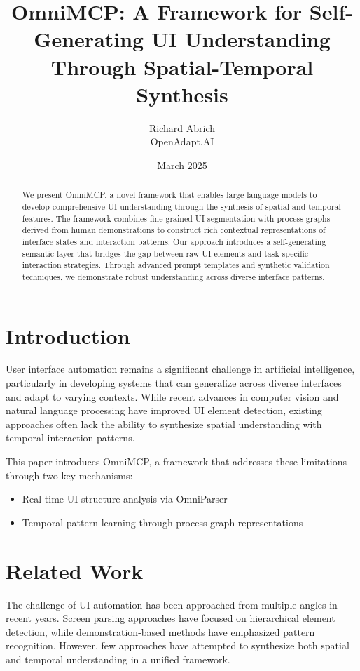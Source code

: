 \documentclass{article}
\title{OmniMCP: A Framework for Self-Generating UI Understanding Through Spatial-Temporal Synthesis}
\author{Richard Abrich \\ OpenAdapt.AI}
\date{March 2025}
\begin{document}
\maketitle

\begin{abstract}
We present OmniMCP, a novel framework that enables large language models to develop comprehensive UI understanding through the synthesis of spatial and temporal features. The framework combines fine-grained UI segmentation with process graphs derived from human demonstrations to construct rich contextual representations of interface states and interaction patterns. Our approach introduces a self-generating semantic layer that bridges the gap between raw UI elements and task-specific interaction strategies. Through advanced prompt templates and synthetic validation techniques, we demonstrate robust understanding across diverse interface patterns.


\end{abstract}

\section{Introduction}
User interface automation remains a significant challenge in artificial intelligence, particularly in developing systems that can generalize across diverse interfaces and adapt to varying contexts. While recent advances in computer vision and natural language processing have improved UI element detection, existing approaches often lack the ability to synthesize spatial understanding with temporal interaction patterns.

This paper introduces OmniMCP, a framework that addresses these limitations through two key mechanisms:
\begin{itemize}
    \item Real-time UI structure analysis via OmniParser
    \item Temporal pattern learning through process graph representations
\end{itemize}

\section{Related Work}
The challenge of UI automation has been approached from multiple angles in recent years. Screen parsing approaches have focused on hierarchical element detection, while demonstration-based methods have emphasized pattern recognition. However, few approaches have attempted to synthesize both spatial and temporal understanding in a unified framework.
\end{document}
